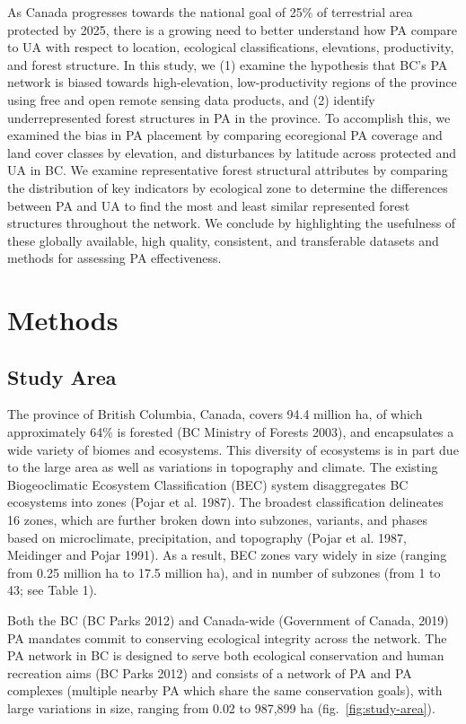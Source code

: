 \documentclass[10pt,oneside]{article}
\begin{document}
As Canada progresses towards the national goal of 25\% of terrestrial
area protected by 2025, there is a growing need to better understand how
PA compare to UA with respect to location, ecological classifications,
elevations, productivity, and forest structure. In this study, we (1)
examine the hypothesis that BC's PA network is biased towards
high-elevation, low-productivity regions of the province using free and
open remote sensing data products, and (2) identify underrepresented
forest structures in PA in the province. To accomplish this, we examined
the bias in PA placement by comparing ecoregional PA coverage and land
cover classes by elevation, and disturbances by latitude across
protected and UA in BC. We examine representative forest structural
attributes by comparing the distribution of key indicators by ecological
zone to determine the differences between PA and UA to find the most and
least similar represented forest structures throughout the network. We
conclude by highlighting the usefulness of these globally available,
high quality, consistent, and transferable datasets and methods for
assessing PA effectiveness.

\hypertarget{methods}{%
\section{Methods}\label{methods}}

\hypertarget{study-area}{%
\subsection{Study Area}\label{study-area}}

The province of British Columbia, Canada, covers 94.4 million ha, of
which approximately 64\% is forested (BC Ministry of Forests 2003), and
encapsulates a wide variety of biomes and ecosystems. This diversity of
ecosystems is in part due to the large area as well as variations in
topography and climate. The existing Biogeoclimatic Ecosystem
Classification (BEC) system disaggregates BC ecosystems into zones
(Pojar et al. 1987). The broadest classification delineates 16 zones,
which are further broken down into subzones, variants, and phases based
on microclimate, precipitation, and topography (Pojar et al. 1987,
Meidinger and Pojar 1991). As a result, BEC zones vary widely in size
(ranging from 0.25 million ha to 17.5 million ha), and in number of
subzones (from 1 to 43; see Table 1).

Both the BC (BC Parks 2012) and Canada-wide (Government of Canada, 2019)
PA mandates commit to conserving ecological integrity across the
network. The PA network in BC is designed to serve both ecological
conservation and human recreation aims (BC Parks 2012) and consists of a
network of PA and PA complexes (multiple nearby PA which share the same
conservation goals), with large variations in size, ranging from 0.02 to
987,899 ha (fig.~\ref{fig:study-area}).
\end{document}
